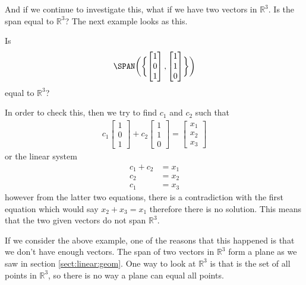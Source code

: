 And if we continue to investigate this, what if we have two vectors in $\mathbb{R}^3$.  Is the span equal to $\mathbb{R}^3$?  The next example looks as this.  

\begin{example}
Is 
%
\begin{align*}
\SPAN\biggl(\biggl\{ \begin{bmatrix}
1 \\ 0 \\ 1 
\end{bmatrix}, \begin{bmatrix}
1 \\ 1 \\ 0 
\end{bmatrix} \biggr\} \biggr)
\end{align*}
equal to $\mathbb{R}^3$?


\solution

In order to check this, then we try to find $c_1$ and $c_2$ such that
%
\begin{align*}
c_1 \begin{bmatrix}
1 \\ 0 \\ 1
\end{bmatrix} + c_2 \begin{bmatrix}
1 \\ 1 \\ 0
\end{bmatrix} = \begin{bmatrix}
x_1 \\ x_2 \\ x_3
\end{bmatrix}
\end{align*}
or the linear system
%
\begin{align*}
c_1 + c_2 & = x_1 \\
c_2 & = x_2 \\
c_1 & = x_3 
\end{align*}
however from the latter two equations, there is a contradiction with the first equation which would say $x_2+x_3 = x_1$ therefore there is no solution.  This means that the two given vectors do not span $\mathbb{R}^3$.  


\end{example}

If we consider the above example, one of the reasons that this happened is that we don't have enough vectors.  The span of two vectors in $\mathbb{R}^3$ form a plane as we saw in section \ref{sect:linear:geom}.  One way to look at $\mathbb{R}^3$ is that is the set of all points in $\mathbb{R}^3$, so there is no way a plane can equal all points.  


